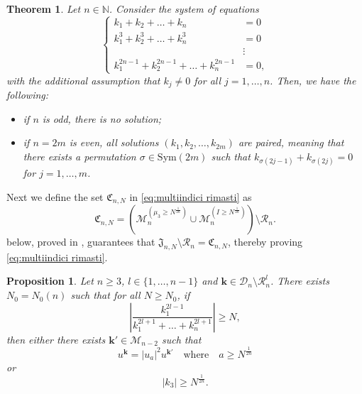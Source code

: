 \documentclass[a4paper,10pt,reqno]{article}
\theoremstyle{definition}
\theoremstyle{plain}
\newtheorem{theorem}[definition]{Theorem}
\theoremstyle{plain}
\theoremstyle{definition}
\theoremstyle{plain}
\theoremstyle{plain}
\newtheorem{prop}[definition]{Proposition}
\theoremstyle{plain}
\theoremstyle{definition}
\theoremstyle{definition}
\def \N{\mathbb N}
\def \M{\mathcal{M}}
\def \k{\bm{k}}
\def \cR{\mathcal{R}}
\begin{document}
\begin{theorem} \label{cor: system}
Let $n\in\N$. Consider the system of equations
\[
\begin{cases}
k_1+k_2+\ldots+k_n &= 0 \\
k_1^3+k_2^3+\ldots+k_n^3 & =0 \\
& \vdots \\
k_1^{2n-1}+k_2^{2n-1}+\ldots+k_n^{2n-1} & =0,
\end{cases}
\]
with the additional assumption that $k_j \neq 0$ for all $j=1,\ldots, n$. Then, we have the following:
\begin{itemize}
    \item if $n$ is odd, there is no solution;
    \item if $n=2m$ is even, all  solutions $(k_1,k_2,\ldots,k_{2m})$ are paired, meaning that there exists a permutation $\sigma \in \mbox{Sym}(2m)$ such that $k_{\sigma(2j-1)}+k_{\sigma(2j)}=0$ for $j=1,\ldots,m$.
\end{itemize} 
\end{theorem} 

\smallskip

Next we define the set $\mathfrak{C}_{n,N}$ in \eqref{eq:multiindici rimasti} as
\begin{equation}
\mathfrak{C}_{n,N} =
\left ( \M_n^{(\mu_3 \ge N^{\frac{1}{2n}})} \cup \M_n^{(I \ge N^{\frac{1}{2n}})} \right ) \setminus \cR_n.
\end{equation}
 below, proved in , guarantees that $\mathfrak{J}_{n,N}\setminus \cR_n = \mathfrak{C}_{n,N}$, thereby proving \eqref{eq:multiindici rimasti}. 



\smallskip

\begin{prop} \label{cor: azione grande o tre indici grandi}
Let $n \ge 3$, $l \in \{ 1,\ldots,n-1 \}$ and $\k \in \mathcal{D}_n \setminus \mathcal{R}_n^{l}$. 
There exists $N_0=N_0(n)$ such that for all $N\geq N_0$, if
\[
\left \lvert \frac{k_1^{2l-1}}{k_1^{2l+1}+\ldots+k_n^{2l+1}} \right \rvert \ge N,
\]
then either there exists $\k' \in \M_{n-2}$ such that 
\begin{equation}
u^{\k} = |u_a|^2 u^{\k'} \quad \text{where} \quad a \ge N^{\frac{1}{2n}}
\label{eq: azione grande}
\end{equation}
or 
\begin{equation}
|k_3| \ge N^{\frac{1}{2n}}.
\label{eq: terzo indice grande}
\end{equation}
\end{prop}
\end{document}
